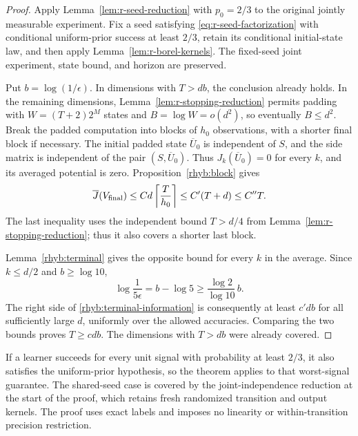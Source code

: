 \begin{proof}
Apply Lemma~\ref{lem:r-seed-reduction} with \(p_0=2/3\) to the
original jointly measurable experiment.  Fix a seed satisfying
\eqref{eq:r-seed-factorization} with conditional uniform-prior success
at least \(2/3\), retain its conditional initial-state law, and then
apply Lemma~\ref{lem:r-borel-kernels}.  The fixed-seed joint experiment,
state bound, and horizon are preserved.

Put \(b=\log(1/\epsilon)\).  In dimensions with \(T>db\), the conclusion
already holds.  In the remaining dimensions, Lemma~\ref{lem:r-stopping-reduction}
permits padding with \(W=(T+2)2^M\) states and
\(B=\log W=o(d^2)\), so eventually \(B\le d^2\).
Break the padded computation into blocks of \(h_0\) observations, with
a shorter final block if necessary.  The initial padded state
\(\overline U_0\) is independent of \(S\), and the side matrix is
independent of the pair \((S,\overline U_0)\).  Thus
\(J_k(\overline U_0)=0\) for every \(k\), and its averaged potential is zero.
Proposition~\ref{rhyb:block} gives
\[
 \overline J(V_{\rm final})
 \le Cd\left\lceil\frac{T}{h_0}\right\rceil
 \le C'(T+d)\le C''T.
\]
The last inequality uses the independent bound \(T>d/4\) from
Lemma~\ref{lem:r-stopping-reduction}; thus it also covers a shorter
last block.

Lemma~\ref{rhyb:terminal} gives the opposite bound for every \(k\) in
the average.  Since \(k\le d/2\) and \(b\ge\log10\),
\[
 \log\frac1{5\epsilon}=b-\log5
 \ge\frac{\log2}{\log10}\,b.
\]
The right side of \eqref{rhyb:terminal-information} is consequently at
least \(c'db\) for all sufficiently large \(d\), uniformly over the
allowed accuracies.  Comparing the two bounds proves \(T\ge cdb\).
The dimensions with \(T>db\) were already covered.
\end{proof}

If a learner succeeds for every unit signal with probability at least
\(2/3\), it also satisfies the uniform-prior hypothesis, so the theorem
applies to that worst-signal guarantee.  The shared-seed case is covered
by the joint-independence reduction at the start of the proof, which
retains fresh randomized transition and output kernels.  The proof uses
exact labels and imposes no linearity or within-transition precision
restriction.
